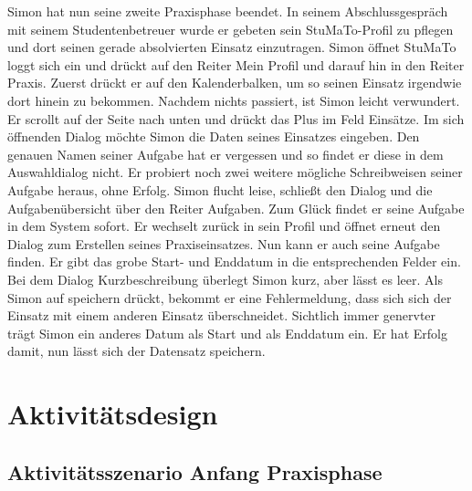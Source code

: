 \documentclass[
  12pt,
  ngerman,
  a4paper,
]{article}
\begin{document}
Simon hat nun seine zweite Praxisphase beendet. In seinem
Abschlussgespräch mit seinem Studentenbetreuer wurde er gebeten sein
StuMaTo-Profil zu pflegen und dort seinen gerade absolvierten Einsatz
einzutragen. Simon öffnet StuMaTo loggt sich ein und drückt auf den
Reiter Mein Profil und darauf hin in den Reiter Praxis. Zuerst drückt er
auf den Kalenderbalken, um so seinen Einsatz irgendwie dort hinein zu
bekommen. Nachdem nichts passiert, ist Simon leicht verwundert. Er
scrollt auf der Seite nach unten und drückt das Plus im Feld Einsätze.
Im sich öffnenden Dialog möchte Simon die Daten seines Einsatzes
eingeben. Den genauen Namen seiner Aufgabe hat er vergessen und so
findet er diese in dem Auswahldialog nicht. Er probiert noch zwei
weitere mögliche Schreibweisen seiner Aufgabe heraus, ohne Erfolg. Simon
flucht leise, schließt den Dialog und die Aufgabenübersicht über den
Reiter Aufgaben. Zum Glück findet er seine Aufgabe in dem System sofort.
Er wechselt zurück in sein Profil und öffnet erneut den Dialog zum
Erstellen seines Praxiseinsatzes. Nun kann er auch seine Aufgabe finden.
Er gibt das grobe Start- und Enddatum in die entsprechenden Felder ein.
Bei dem Dialog Kurzbeschreibung überlegt Simon kurz, aber lässt es leer.
Als Simon auf speichern drückt, bekommt er eine Fehlermeldung, dass sich
sich der Einsatz mit einem anderen Einsatz überschneidet. Sichtlich
immer genervter trägt Simon ein anderes Datum als Start und als Enddatum
ein. Er hat Erfolg damit, nun lässt sich der Datensatz speichern.

\hypertarget{aktivituxe4tsdesign}{%
\section{Aktivitätsdesign}\label{aktivituxe4tsdesign}}

\hypertarget{aktivituxe4tsszenario-anfang-praxisphase}{%
\subsection{Aktivitätsszenario Anfang
Praxisphase}\label{aktivituxe4tsszenario-anfang-praxisphase}}
\end{document}
